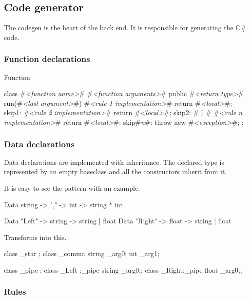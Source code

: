 \subsection{Code generator}
The codegen is the heart of the back end.
It is responsible for generating the C\# code.

\subsubsection{Function declarations}
Function

\begin{code}
class #\textit{<function name>}# {
    #\textit{<function arguments>}#
    public #\textit{<return type>}# 
    run(#\textit{<last argument>}#) {
        {
            #\textit{<rule 1 implementation>}#
            return #\textit{<local>}#;
        }
      skip1:
        {
            #\textit{<rule 2 implementation>}#
            return #\textit{<local>}#;
        }
      skip2:
        #\vdots#
        {
            #\textit{<rule n implementation>}#
            return #\textit{<local>}#;
        }
      skip#\textit{n}#:
        throw new #\textit{<exception>}#;
    }
};
\end{code}

\subsubsection{Data declarations}
Data declarations are implemented with inheritance.
The declared type is represented by an empty baseclass and all the constructors inherit from it.

It is easy to see the pattern with an example.

\begin{code}
Data string -> "," -> int -> string * int

Data "Left"  -> string -> string | float
Data "Right" -> float  -> string | float
\end{code}

Transforms into this.

\begin{code}
class _star {};
class _comma { string _arg0; int _arg1;}

class _pipe {};
class _Left :_pipe {string _arg0;};
class _Right:_pipe {float  _arg0;};
\end{code}

\subsubsection{Rules}

